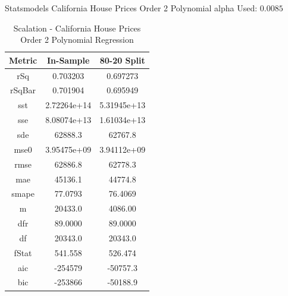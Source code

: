 \documentclass{article}
\begin{document}
\noindent Statsmodels California House Prices Order 2 Polynomial alpha Used: $0.0085$

\begin{table}[H]
\centering
\caption{Scalation - California House Prices Order 2 Polynomial Regression}
\label{tab:Scalation - House Prices Order 2 Polynomial Regression}
\begin{tabular}{|c|c|c|} \hline 
Metric & In-Sample & 80-20 Split \\ \hline \hline 
rSq &0.703203 & 0.697273 \\ \hline 
rSqBar &0.701904 &      0.695949 \\ \hline 
sst &2.72264e+14 &      5.31945e+13 \\ \hline 
sse &8.08074e+13 &      1.61034e+13 \\ \hline 
sde &62888.3 &  62767.8 \\ \hline 
mse0 &3.95475e+09 &     3.94112e+09 \\ \hline 
rmse &62886.8 & 62778.3 \\ \hline 
mae &45136.1 &  44774.8 \\ \hline 
smape &77.0793 &        76.4069 \\ \hline 
m &20433.0 &    4086.00 \\ \hline 
dfr &89.0000 &  89.0000 \\ \hline 
df &20343.0 &   20343.0 \\ \hline 
fStat &541.558 &        526.474 \\ \hline 
aic &-254579 &  -50757.3 \\ \hline 
bic &-253866 &  -50188.9 \\ \hline 
\end{tabular}
\end{table}
\end{document}

